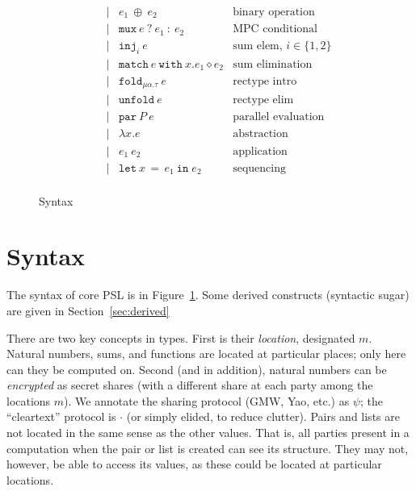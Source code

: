 \documentclass[10pt]{article}
\newcommand{\kw}[1]{\ensuremath{\mathtt{#1}}}
\newcommand{\trec}[2]{\ensuremath{\mu {#1}.{#2}}}
\newcommand{\ebinop}[2]{\ensuremath{{#1}~\oplus~{#2}}}
\newcommand{\elet}[3]{\ensuremath{\kw{let}~#1\, =\, #2~\kw{in}\;{#3}}}
\newcommand{\epar}[2]{\ensuremath{\kw{par}~{#1}~{#2}}}
\newcommand{\econd}[3]{\ensuremath{\kw{match}~{#1}~\kw{with}~x.{#2} \diamond {#3}}}
\newcommand{\emux}[3]{\ensuremath{\kw{mux}~{#1}~\kw{?}~{#2}~\kw{:}~{#3}}}
\newcommand{\einj}[2]{\ensuremath{\kw{inj}_{#1}~{#2}}}
\newcommand{\elam}[2]{\ensuremath{\lambda {#1}.{#2}}}
\newcommand{\eapp}[2]{\ensuremath{{#1}~{#2}}}
\newcommand{\efold}[2]{\ensuremath{\kw{fold}_{#1}~{#2}}}
\newcommand{\eunfold}[1]{\ensuremath{\kw{unfold}~{#1}}}
\begin{document}
\begin{figure}[h]
\[\begin{array}{rlcll}
                       && \mid & \ebinop{e_1}{e_2}  & \text{binary operation} \\
                       && \mid & \emux{e}{e_1}{e_2}  & \text{MPC conditional} \\
                       && \mid & \einj{i}{e} & \text{sum elem, }i \in \{1,2\}\\
                       && \mid & \econd{e}{e_1}{e_2}  & \text{sum elimination} \\
                       && \mid & \efold{\trec{\alpha}{\tau}}{e} & \text{rectype intro}\\
                       && \mid & \eunfold{e} & \text{rectype elim}\\
                       && \mid & \epar{P}{e} & \text{parallel evaluation}\\
                       && \mid & \elam{x}{e}  & \text{abstraction} \\
                       && \mid & \eapp{e_1}{e_2}  & \text{application} \\
                       && \mid & \elet{x}{e_1}{e_2}  & \text{sequencing} \\
  \end{array}
  \]
  \caption{Syntax}
  \label{fig:syntax}
\end{figure}

\newpage

\section{Syntax}
  
The syntax of core PSL is in Figure~\ref{fig:syntax}. Some derived
constructs (syntactic sugar) are given in Section~\ref{sec:derived}

There are two key concepts in types. First is their \emph{location},
designated $m$. Natural numbers, sums, and functions are located at
particular places; only here can they be computed on. Second (and in
addition), natural numbers can be \emph{encrypted} as secret
shares (with a different share at each party among the locations
$m$). We annotate the sharing protocol (GMW, Yao, etc.) as $\psi$; the
``cleartext'' protocol is $\cdot$ (or simply elided, to reduce
clutter). Pairs and lists are not located in the same sense as the
other values. That is, all parties present in a computation when the
pair or list is created can see its structure. They may not, however,
be able to access its values, as these could be located at particular
locations.
\end{document}
